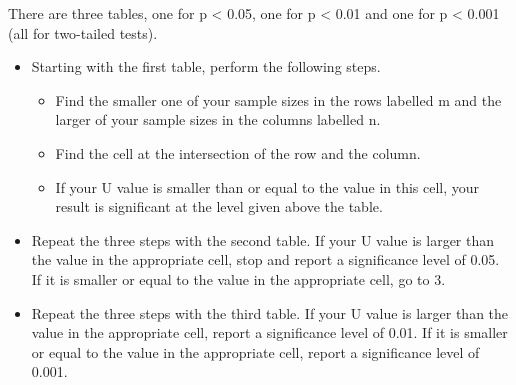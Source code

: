 There are three tables, one for p < 0.05, one for p < 0.01 and one for p < 0.001 (all for two-tailed tests).

\begin{itemize}
    \item Starting with the first table, perform the following steps.
    \begin{itemize}
        \item Find the smaller one of your sample sizes in the rows labelled m and the larger of your sample sizes in the columns labelled n.
        \item Find the cell at the intersection of the row and the column.
        \item If your U value is smaller than or equal to the value in this cell, your result is significant at the level given above the table.
    \end{itemize}
    \item Repeat the three steps with the second table. If your U value is larger than the value in the appropriate cell, stop and report a significance level of 0.05. If it is smaller or equal to the value in the appropriate cell, go to 3.
    \item Repeat the three steps with the third table. If your U value is larger than the value in the appropriate cell, report a significance level of 0.01. If it is smaller or equal to the value in the appropriate cell, report a significance level of 0.001.
\end{itemize}

